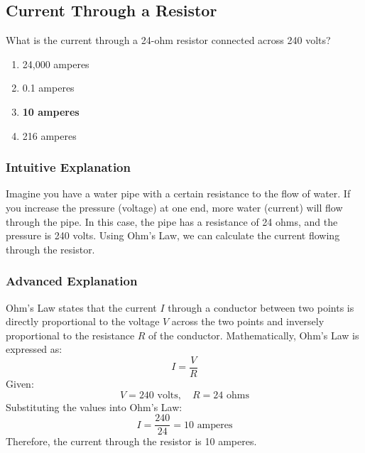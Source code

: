 \subsection{Current Through a Resistor}
\label{T5D09}

\begin{tcolorbox}[colback=gray!10!white,colframe=black!75!black,title=T5D09]
What is the current through a 24-ohm resistor connected across 240 volts?
\begin{enumerate}[noitemsep]
    \item 24,000 amperes
    \item 0.1 amperes
    \item \textbf{10 amperes}
    \item 216 amperes
\end{enumerate}
\end{tcolorbox}

\subsubsection*{Intuitive Explanation}
Imagine you have a water pipe with a certain resistance to the flow of water. If you increase the pressure (voltage) at one end, more water (current) will flow through the pipe. In this case, the pipe has a resistance of 24 ohms, and the pressure is 240 volts. Using Ohm's Law, we can calculate the current flowing through the resistor.

\subsubsection*{Advanced Explanation}
Ohm's Law states that the current \( I \) through a conductor between two points is directly proportional to the voltage \( V \) across the two points and inversely proportional to the resistance \( R \) of the conductor. Mathematically, Ohm's Law is expressed as:
\[
I = \frac{V}{R}
\]
Given:
\[
V = 240 \text{ volts}, \quad R = 24 \text{ ohms}
\]
Substituting the values into Ohm's Law:
\[
I = \frac{240}{24} = 10 \text{ amperes}
\]
Therefore, the current through the resistor is 10 amperes.